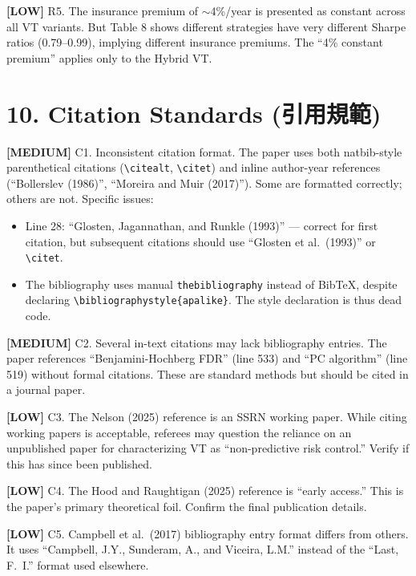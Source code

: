 \documentclass[12pt,a4paper]{article}
\newcommand{\med}[1]{\textcolor{warncolor}{\textbf{[MEDIUM]} #1}}
\newcommand{\low}[1]{\textcolor{okgreen}{\textbf{[LOW]} #1}}
\begin{document}
\low{R5. The insurance premium of $\sim$4\%/year is presented as constant across all VT variants.} But Table 8 shows different strategies have very different Sharpe ratios (0.79--0.99), implying different insurance premiums. The ``4\% constant premium'' applies only to the Hybrid VT.


\section*{10. Citation Standards (引用規範)}

\med{C1. Inconsistent citation format.} The paper uses both natbib-style parenthetical citations (\texttt{\textbackslash citealt}, \texttt{\textbackslash citet}) and inline author-year references (``Bollerslev (1986)'', ``Moreira and Muir (2017)''). Some are formatted correctly; others are not. Specific issues:
\begin{itemize}[nosep]
\item Line 28: ``Glosten, Jagannathan, and Runkle (1993)'' --- correct for first citation, but subsequent citations should use ``Glosten et al.\ (1993)'' or \texttt{\textbackslash citet}.
\item The bibliography uses manual \texttt{thebibliography} instead of BibTeX, despite declaring \texttt{\textbackslash bibliographystyle\{apalike\}}. The style declaration is thus dead code.
\end{itemize}

\med{C2. Several in-text citations may lack bibliography entries.} The paper references ``Benjamini-Hochberg FDR'' (line 533) and ``PC algorithm'' (line 519) without formal citations. These are standard methods but should be cited in a journal paper.

\low{C3. The Nelson (2025) reference is an SSRN working paper.} While citing working papers is acceptable, referees may question the reliance on an unpublished paper for characterizing VT as ``non-predictive risk control.'' Verify if this has since been published.

\low{C4. The Hood and Raughtigan (2025) reference is ``early access.''} This is the paper's primary theoretical foil. Confirm the final publication details.

\low{C5. Campbell et al.\ (2017) bibliography entry format differs from others.} It uses ``Campbell, J.Y., Sunderam, A., and Viceira, L.M.'' instead of the ``Last, F.~I.'' format used elsewhere.
\end{document}
